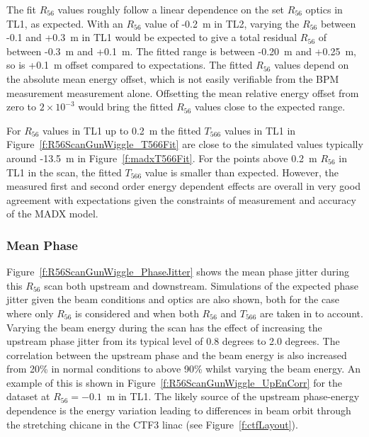 The fit \(R_{56}\) values roughly follow a linear dependence on the set \(R_{56}\) optics in TL1, as expected. With an \(R_{56}\) value of -0.2~m in TL2, varying the \(R_{56}\) between -0.1 and +0.3~m in TL1 would be expected to give a total residual \(R_{56}\) of between -0.3~m and +0.1~m. The fitted range is between -0.20~m and +0.25~m, so is +0.1~m offset compared to expectations. The fitted \(R_{56}\) values depend on the absolute mean energy offset, which is not easily verifiable from the BPM measurement measurement alone. Offsetting the mean relative energy offset from zero to \(2\times10^{-3}\) would bring the fitted \(R_{56}\) values close to the expected range.

For \(R_{56}\) values in TL1 up to 0.2~m the fitted \(T_{566}\) values in TL1 in Figure~\ref{f:R56ScanGunWiggle_T566Fit} are close to the simulated values typically around -13.5~m in Figure~\ref{f:madxT566Fit}. For the points above 0.2~m \(R_{56}\) in TL1 in the scan, the fitted \(T_{566}\) value is smaller than expected. However, the measured first and second order energy dependent effects are overall in very good agreement with expectations given the constraints of measurement and accuracy of the MADX model.


\subsubsection{Mean Phase}

Figure~\ref{f:R56ScanGunWiggle_PhaseJitter} shows the mean phase jitter during this \(R_{56}\) scan both upstream and downstream. Simulations of the expected phase jitter given the beam conditions and optics are also shown, both for the case where only \(R_{56}\) is considered and when both \(R_{56}\) and \(T_{566}\) are taken in to account. Varying the beam energy during the scan has the effect of increasing the upstream phase jitter from its typical level of 0.8 degrees to 2.0 degrees. The correlation between the upstream phase and the beam energy is also increased from 20\% in normal conditions to above 90\% whilst varying the beam energy. An example of this is shown in Figure~\ref{f:R56ScanGunWiggle_UpEnCorr} for the dataset at \(R_{56}=-0.1\)~m in TL1. The likely source of the upstream phase-energy dependence is the energy variation leading to differences in beam orbit through the stretching chicane in the CTF3 linac (see Figure~\ref{f:ctfLayout}).

